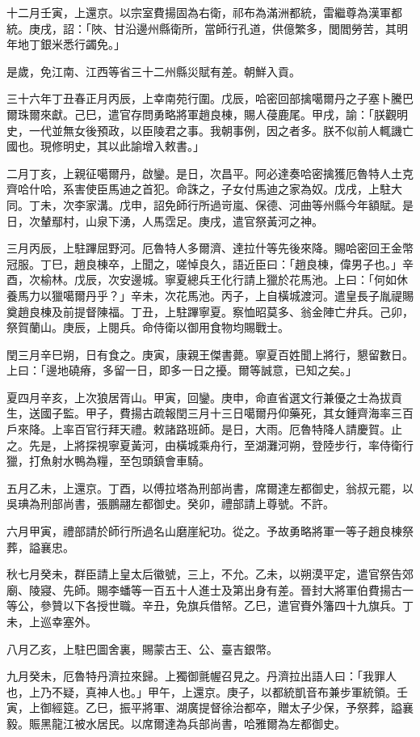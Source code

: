 \begin{pinyinscope}
十二月壬寅，上還京。以宗室費揚固為右衛，祁布為滿洲都統，雷繼尊為漢軍都統。庚戌，詔：「陜、甘沿邊州縣衛所，當師行孔道，供億繁多，閭閻勞苦，其明年地丁銀米悉行蠲免。」

是歲，免江南、江西等省三十二州縣災賦有差。朝鮮入貢。

三十六年丁丑春正月丙辰，上幸南苑行圍。戊辰，哈密回部擒噶爾丹之子塞卜騰巴爾珠爾來獻。己巳，遣官存問勇略將軍趙良棟，賜人葠鹿尾。甲戌，諭：「朕觀明史，一代並無女後預政，以臣陵君之事。我朝事例，因之者多。朕不似前人輒譏亡國也。現修明史，其以此諭增入敕書。」

二月丁亥，上親征噶爾丹，啟鑾。是日，次昌平。阿必達奏哈密擒獲厄魯特人土克齊哈什哈，系害使臣馬迪之首犯。命誅之，子女付馬迪之家為奴。戊戌，上駐大同。丁未，次李家溝。戊申，詔免師行所過岢嵐、保德、河曲等州縣今年額賦。是日，次輦鄢村，山泉下湧，人馬霑足。庚戌，遣官祭黃河之神。

三月丙辰，上駐蹕屈野河。厄魯特人多爾濟、達拉什等先後來降。賜哈密回王金幣冠服。丁巳，趙良棟卒，上聞之，嗟悼良久，語近臣曰：「趙良棟，偉男子也。」辛酉，次榆林。戊辰，次安邊城。寧夏總兵王化行請上獵於花馬池。上曰：「何如休養馬力以獵噶爾丹乎？」辛未，次花馬池。丙子，上自橫城渡河。遣皇長子胤禔賜奠趙良棟及前提督陳福。丁丑，上駐蹕寧夏。察恤昭莫多、翁金陣亡弁兵。己卯，祭賀蘭山。庚辰，上閱兵。命侍衛以御用食物均賜戰士。

閏三月辛巳朔，日有食之。庚寅，康親王傑書薨。寧夏百姓聞上將行，懇留數日。上曰：「邊地磽瘠，多留一日，即多一日之擾。爾等誠意，已知之矣。」

夏四月辛亥，上次狼居胥山。甲寅，回鑾。庚申，命直省選文行兼優之士為拔貢生，送國子監。甲子，費揚古疏報閏三月十三日噶爾丹仰藥死，其女鍾齊海率三百戶來降。上率百官行拜天禮。敕諸路班師。是日，大雨。厄魯特降人請慶賀。止之。先是，上將探視寧夏黃河，由橫城乘舟行，至湖灘河朔，登陸步行，率侍衛行獵，打魚射水鴨為糧，至包頭鎮會車騎。

五月乙未，上還京。丁酉，以傅拉塔為刑部尚書，席爾達左都御史，翁叔元罷，以吳琠為刑部尚書，張鵬翮左都御史。癸卯，禮部請上尊號。不許。

六月甲寅，禮部請於師行所過名山磨崖紀功。從之。予故勇略將軍一等子趙良棟祭葬，謚襄忠。

秋七月癸未，群臣請上皇太后徽號，三上，不允。乙未，以朔漠平定，遣官祭告郊廟、陵寢、先師。賜李蟠等一百五十人進士及第出身有差。晉封大將軍伯費揚古一等公，參贊以下各授世職。辛丑，免旗兵借帑。乙巳，遣官賚外籓四十九旗兵。丁未，上巡幸塞外。

八月乙亥，上駐巴圖舍裏，賜蒙古王、公、臺吉銀幣。

九月癸未，厄魯特丹濟拉來歸。上獨御氈幄召見之。丹濟拉出語人曰：「我罪人也，上乃不疑，真神人也。」甲午，上還京。庚子，以都統凱音布兼步軍統領。壬寅，上御經筵。乙巳，振平將軍、湖廣提督徐治都卒，贈太子少保，予祭葬，謚襄毅。賑黑龍江被水居民。以席爾達為兵部尚書，哈雅爾為左都御史。


\end{pinyinscope}
